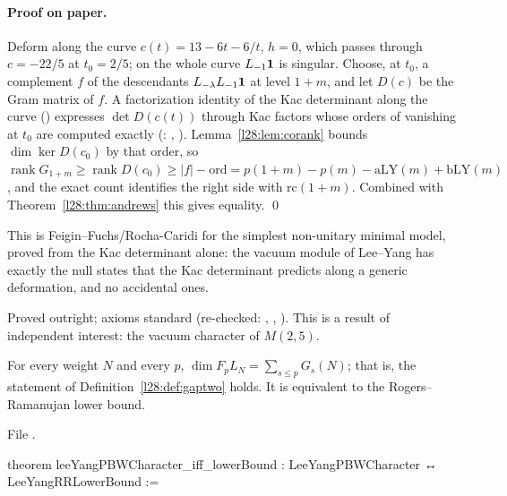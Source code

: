 \paragraph{Proof on paper.} Deform along the curve $c(t)=13-6t-6/t$, $h=0$, which passes through $c=-22/5$ at $t_0=2/5$; on the whole curve $L_{-1}\mathbf 1$
is singular. Choose, at $t_0$, a complement $f$ of the descendants $L_{-\lambda}L_{-1}\mathbf 1$ at level $1+m$, and let $D(c)$ be the Gram matrix of $f$. A
factorization identity of the Kac determinant along the curve () expresses $\det D(c(t))$ through Kac factors whose orders of vanishing
at $t_0$ are computed exactly (: , ). Lemma~\ref{l28:lem:corank} bounds $\dim\ker D(c_0)$ by that order, so
$\operatorname{rank}G_{1+m}\ge\operatorname{rank}D(c_0)\ge|f|-\mathrm{ord}=p(1+m)-p(m)-\mathrm{aLY}(m)+\mathrm{bLY}(m)$, and the exact count
 identifies the right side with $\mathrm{rc}(1+m)$. Combined with Theorem~\ref{l28:thm:andrews} this gives equality. \qed

\begin{physics}
This is Feigin--Fuchs/Rocha-Caridi for the simplest non-unitary minimal model, proved from the Kac determinant alone: the vacuum module of Lee--Yang has exactly the
null states that the Kac determinant predicts along a generic deformation, and no accidental ones.
\end{physics}

\begin{status}
Proved outright; axioms standard (re-checked: , ,
). This is a result of independent interest: the vacuum character of $M(2,5)$.
\end{status}

\begin{theorem}\label{l28:thm:pbwchar}
For every weight $N$ and every $p$, $\dim F_pL_N=\sum_{s\le p}G_s(N)$; that is, the statement  of
Definition~\ref{l28:def:gaptwo} holds. It is equivalent to the Rogers--Ramanujan lower bound.
\end{theorem}

\noindent File .
\begin{leancode}
theorem leeYangPBWCharacter_iff_lowerBound : LeeYangPBWCharacter ↔ LeeYangRRLowerBound :=
\end{leancode}

